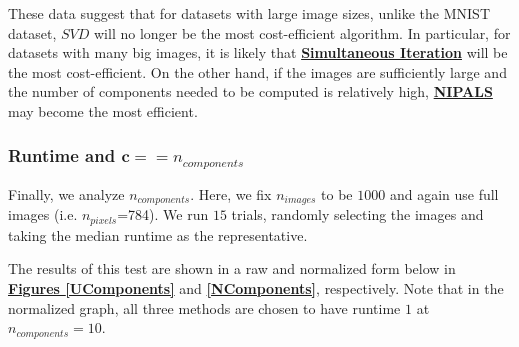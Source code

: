 \documentclass[12pt]{article}
\begin{document}
These data suggest that for datasets with large image sizes, unlike the MNIST dataset, $SVD$ will no longer be the most cost-efficient algorithm. In particular, for datasets with many big images, it is likely that \textbf{\hyperref[3.3]{Simultaneous Iteration}} will be the most cost-efficient. On the other hand, if the images are sufficiently large and the number of components needed to be computed is relatively high, \textbf{\hyperref[3.1]{NIPALS}} may become the most efficient.

\subsubsection{Runtime and $\textbf{c} == n_{components}$}\label{5.1.4}

Finally, we analyze $n_{components}$. Here, we fix $n_{images}$ to be $1000$ and again use full images (i.e. $n_{pixels}$=784). We run $15$ trials, randomly selecting the images and taking the median runtime as the representative. 

The results of this test are shown in a raw and normalized form below in \textbf{\hyperref[UPixels]{Figures \ref*{UComponents}}} and \textbf{\hyperref[NPixels]{\ref*{NComponents}}}, respectively. Note that in the normalized graph, all three methods are chosen to have runtime $1$ at $n_{components} = 10$.
\end{document}
